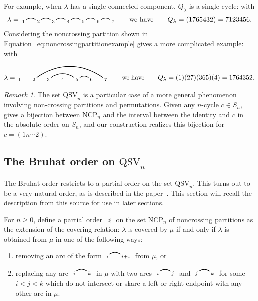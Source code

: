 \documentclass[12pt]{amsart}
\theoremstyle{definition}
\theoremstyle{remark}
\newtheorem{rem}[equation]{Remark}
\numberwithin{equation}{section}
\newcommand{\QSV}{\mathrm{QSV}}
\newcommand{\NCP}{\mathrm{NCP}}
\newcommand{\edge}[2]{\tikz[scale = 0.75, baseline = -0.2cm]{
\draw (0.1, 0) node[inner sep = 0ex] (a) {};
\node[left, xshift = 0.1cm, yshift = -0.1cm] at (a) {$\scriptstyle #1$};
\draw (0.9, 0)  node[inner sep = 0ex] (b) {};
\node[right, xshift = -0.1cm, yshift = -0.1cm] at (b) {$\scriptstyle #2$};
\draw[thick] (a) to[out = 35, in = 145] (b);}}
\begin{document}
For example, when $\lambda$ has a single connected component, $Q_{\lambda}$ is a single cycle: with
\[
\lambda = \begin{tikzpicture}[scale = 0.75, baseline = 0.75*-0.2]
\foreach \x in {1, ..., 7}{\draw[fill] (\x - 1, 0) node[inner sep = 2pt] (\x) {$\scriptstyle \x$};}
\foreach \i\j in {1/2, 2/3, 3/4, 4/5, 5/6, 6/7}{\draw[thick] (\i) to[out = 35, in = 145] (\j);}
\end{tikzpicture}
\qquad\text{we have}\qquad
Q_{\lambda} = (1765432) = 7123456.
\]
Considering the noncrossing partition shown in Equation~\eqref{eq:noncrossingpartitionexample} gives a more complicated example: with
\[
\lambda = \begin{tikzpicture}[scale = 0.75, baseline = 0.75*-0.2]
\foreach \x in {1, ..., 7}{\draw[fill] (\x - 1, 0) node[inner sep = 2pt] (\x) {$\scriptstyle \x$};}
\foreach \i\j in {5/6, 3/5,2/7}{\draw[thick] (\i) to[out = 35, in = 145] (\j);}
\end{tikzpicture}
\qquad\text{we have}\qquad
Q_{\lambda} = (1)(27)(365)(4) = 1764352.
\]

\begin{rem}
\label{rem:QSVnoncrossing}
The set $\QSV_{n}$ is a particular case of a more general phenomenon involving non-crossing partitions and permutations.  
Given any $n$-cycle $c \in S_{n}$,~\cite{Baine} gives a bijection between $\NCP_{n}$ and the interval between the identity and $c$ in the absolute order on $S_{n}$, and our construction realizes this bijection for $c = (1n\cdots 2)$.  
\end{rem}

\subsection{The Bruhat order on $\QSV_{n}$}
\label{sec:bruhatballot}

The Bruhat order restricts to a partial order on the set $\QSV_{n}$.
This turns out to be a very natural order, as is described in the paper~\cite{GobetWilliams}.  
This section will recall the description from this source for use in later sections.

For $n \ge 0$, define a partial order $\preceq$ on the set $\NCP_{n}$ of noncrossing partitions as the extension of the covering relation: $\lambda$ is covered by $\mu$ if and only if $\lambda$ is obtained from $\mu$ in one of the following ways:
\begin{enumerate}
\item removing an arc of the form $ \edge{i}{i+1}$ from $\mu$, or

\item replacing any arc $ \edge{i}{k}$ in $\mu$ with two arcs $ \edge{i}{j}$ and $ \edge{j}{k}$ for some $i < j < k$ which do not intersect or share a left or right endpoint with any other arc in $\mu$.

\end{enumerate}
\end{document}
